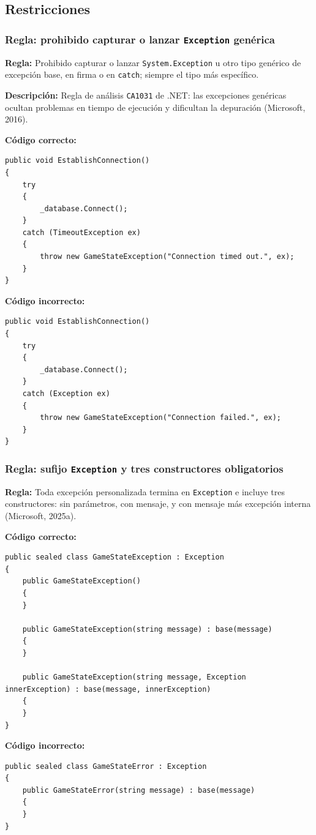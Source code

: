 \subsection{Restricciones}

\subsubsection{Regla: prohibido capturar o lanzar \texttt{Exception} genérica}

\textbf{Regla:} Prohibido capturar o lanzar \texttt{System.Exception} u otro tipo genérico de excepción base, en firma o en \texttt{catch}; siempre el tipo más específico.

\textbf{Descripción:} Regla de análisis \texttt{CA1031} de .NET: las excepciones genéricas ocultan problemas en tiempo de ejecución y dificultan la depuración (Microsoft, 2016).

\textbf{Código correcto:}
\begin{lstlisting}[style=csharpstyle]
public void EstablishConnection()
{
    try
    {
        _database.Connect();
    }
    catch (TimeoutException ex)
    {
        throw new GameStateException("Connection timed out.", ex);
    }
}
\end{lstlisting}

\textbf{Código incorrecto:}
\begin{lstlisting}[style=csharpstyle]
public void EstablishConnection()
{
    try
    {
        _database.Connect();
    }
    catch (Exception ex)
    {
        throw new GameStateException("Connection failed.", ex);
    }
}
\end{lstlisting}

\subsubsection{Regla: sufijo \texttt{Exception} y tres constructores obligatorios}

\textbf{Regla:} Toda excepción personalizada termina en \texttt{Exception} e incluye tres constructores: sin parámetros, con mensaje, y con mensaje más excepción interna (Microsoft, 2025a).

\textbf{Código correcto:}
\begin{lstlisting}[style=csharpstyle]
public sealed class GameStateException : Exception
{
    public GameStateException()
    {
    }

    public GameStateException(string message) : base(message)
    {
    }

    public GameStateException(string message, Exception innerException) : base(message, innerException)
    {
    }
}
\end{lstlisting}

\textbf{Código incorrecto:}
\begin{lstlisting}[style=csharpstyle]
public sealed class GameStateError : Exception
{
    public GameStateError(string message) : base(message)
    {
    }
}
\end{lstlisting}
